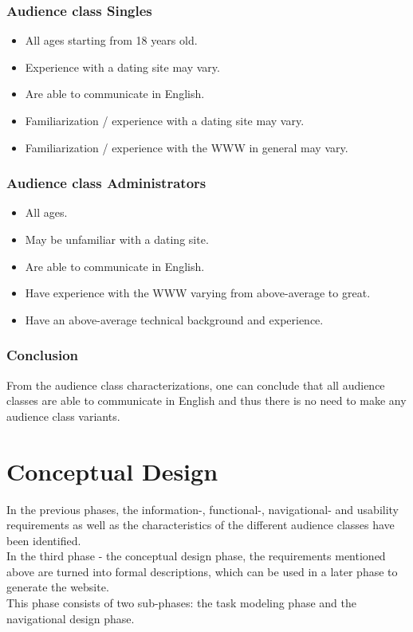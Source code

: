 \documentclass[11pt, a4paper,svglistings,oneside]{book}
\begin{document}
\subsection{Audience class Singles}

\begin{itemize}
\item All ages starting from 18 years old.
\item Experience with a dating site may vary.
\item Are able to communicate in English.
\item Familiarization / experience with a dating site may vary.
\item Familiarization / experience with the WWW in general may vary.
\end{itemize}

\subsection{Audience class Administrators}

\begin{itemize}
\item All ages.
\item May be unfamiliar with a dating site.
\item Are able to communicate in English.
\item Have experience with the WWW varying from above-average to great.
\item Have an above-average technical background and experience.
\end{itemize}

\subsection{Conclusion}

From the audience class characterizations, one can conclude that all audience classes are able to communicate in English and thus there is no need to make any audience class variants.

\chapter{Conceptual Design}

In the previous phases, the information-, functional-, navigational- and usability requirements as well as the characteristics of the different audience classes have been identified. \\
In the third phase - the conceptual design phase, the requirements mentioned above are turned into formal descriptions, which can be used in a later phase to generate the website. \\
This phase consists of two sub-phases: the task modeling phase and the navigational design phase.
\end{document}
